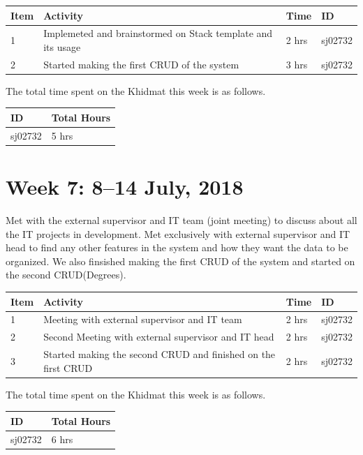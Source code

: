 \documentclass{article}
\begin{document}
\begin{tabular}{|l|l|l|l|}
  \hline
  Item 	& Activity & Time & ID \\\hline\hline
  1	& Implemeted and brainstormed on Stack template and its usage & 2 hrs & sj02732 \\\hline
  2	& Started making the first CRUD of the system & 3 hrs & sj02732 \\\hline
\end{tabular}
\newline
The total time spent on the Khidmat this week is as follows.

\begin{tabular}{|l|l|}
  \hline
  ID & Total Hours\\\hline\hline
  sj02732 & 5 hrs\\\hline
\end{tabular}

\newpage %
\section*{Week 7: 8--14 July, 2018}

Met with the external supervisor and IT team (joint meeting) to discuss about all the IT projects in development. Met exclusively with external supervisor and IT head to find any other features in the system and how they want the data to be organized. We also finsished making the first CRUD of the system and started on the second CRUD(Degrees). \newline

\begin{tabular}{|l|l|l|l|}
  \hline
  Item 	& Activity & Time & ID \\\hline\hline
  1	& Meeting with external supervisor and IT team & 2 hrs & sj02732 \\\hline
  2	& Second Meeting with external supervisor and IT head & 2 hrs & sj02732 \\\hline
  3	& Started making the second CRUD and finished on the first CRUD & 2 hrs & sj02732 \\\hline
\end{tabular}
\newline
The total time spent on the Khidmat this week is as follows.

\begin{tabular}{|l|l|}
  \hline
  ID & Total Hours\\\hline\hline
  sj02732 & 6 hrs\\\hline
\end{tabular}
\end{document}
